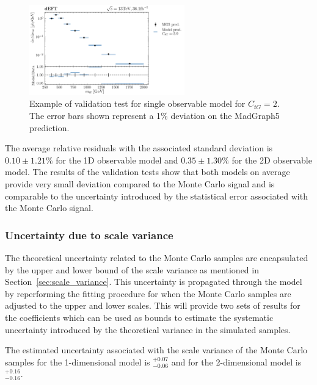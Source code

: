 \documentclass[a4paper,11pt]{article}
\begin{document}
\begin{figure}[htb]
    \centering
    \includegraphics[width=0.6\textwidth]{plots/validation_ATLAS-ctg_2_1D_1OP.png}
    \caption{Example of validation test for single observable model for $C_{tG}=2$. The error bars shown represent a 1\% deviation on the MadGraph5 prediction.}
    \label{fig:test_example}
\end{figure}

The average relative residuals with the associated standard deviation is $0.10\pm1.21\%$ for the 1D observable model and $0.35\pm1.30\%$ for the 2D observable model.
The results of the validation tests show that both models on average provide very small deviation compared to the Monte Carlo signal and is comparable to the uncertainty introduced by the statistical error associated with the Monte Carlo signal.

\subsubsection{Uncertainty due to scale variance}
The theoretical uncertainty related to the Monte Carlo samples are encapsulated by the upper and lower bound of the scale variance as mentioned in Section~\ref{sec:scale_variance}.
This uncertainty is propagated through the model by reperforming the fitting procedure for when the Monte Carlo samples are adjusted to the upper and lower scales.
This will provide two sets of results for the coefficients which can be used as bounds to estimate the systematic uncertainty introduced by the theoretical variance in the simulated samples.

The estimated uncertainty associated with the scale variance of the Monte Carlo samples for the 1-dimensional model is $^{+0.07}_{-0.06}$ and for the 2-dimensional model is $^{+0.16}_{-0.16}$.
\end{document}
